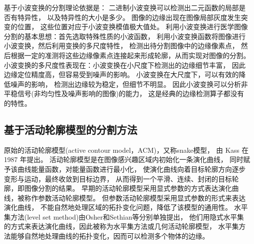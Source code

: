 基于小波变换的分割理论依据是：
二进制小波变换可以检测出二元函数的局部是否有特异性，
以及特异性的大小是多少。
图像的边缘出现在图像局部灰度发生突变的位置，
这些位置对应于小波变换模值极大值处。
利用小波变换进行医学图像分割的基本思想：首先选取特殊性质的小波函数，
利用小波变换函数将图像进行小波变换，然后利用变换的多尺度特性，
检测出待分割图像中的边缘像素点，
然后根据一定的准测将这些边缘像素点连接起来形成轮廓，从而实现对图像的分割。
小波变换的多尺度性表现在：小波变换在小尺度下检测出的边缘细节丰富，
因此边缘定位精度高，但容易受到噪声的影响。
小波变换在大尺度下，可以有效的降低噪声的影响，
检测出边缘较为稳定，但细节不明显。
因此小波变换可以分析非平稳信号(非均匀性及噪声影响的图像)的能力，
这是经典的边缘检测算子都没有的特性。

\subsection{基于活动轮廓模型的分割方法}
原始的活动轮廓模型(active contour  model，ACM)，又称snake模型，
由 Kass 在 1987 年提出。
活动轮廓模型是在图像感兴趣区域内初始化一条演化曲线，
同时赋予该曲线能量函数，对能量函数进行最小化，
使演化曲线向着目标轮廓方向逐步变形与运动，最终收敛到目标边界，
从而得到一个平滑、连续、封闭的目标轮廓，即图像分割的结果。
早期的活动轮廓模型采用显式参数的方式表达演化曲线，被称作参数活动轮廓模型。
但参数活动轮廓模型采用显式参数的形式来表达演化曲线，
不能自然地处理区域的拓扑变化问题，降低了该模型的通用性。
水平集方法(level set method)由Osher和Sethian等分别单独提出，
他们用隐式水平集的方式来表达演化曲线，因此被称为水平集方法或几何活动轮廓模型，
水平集方法能够自然地处理曲线的拓扑变化，因而可以检测多个物体的边缘。


